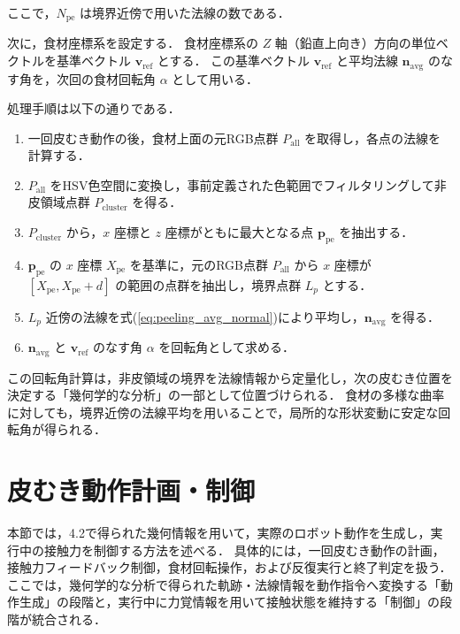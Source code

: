 ここで，$N_{\mathrm{pe}}$ は境界近傍で用いた法線の数である．

次に，食材座標系を設定する．
食材座標系の $Z$ 軸（鉛直上向き）方向の単位ベクトルを基準ベクトル $\mathbf{v}_{\mathrm{ref}}$ とする．
この基準ベクトル $\mathbf{v}_{\mathrm{ref}}$ と平均法線 $\mathbf{n}_{\mathrm{avg}}$ のなす角を，次回の食材回転角 $\alpha$ として用いる．


処理手順は以下の通りである．

\begin{enumerate}
  \item 一回皮むき動作の後，食材上面の元RGB点群 $P_{\mathrm{all}}$ を取得し，各点の法線を計算する．
  \item $P_{\mathrm{all}}$ をHSV色空間に変換し，事前定義された色範囲でフィルタリングして非皮領域点群 $P_{\mathrm{cluster}}$ を得る．
  \item $P_{\mathrm{cluster}}$ から，$x$ 座標と $z$ 座標がともに最大となる点 $\mathbf{p}_{\mathrm{pe}}$ を抽出する．
  \item $\mathbf{p}_{\mathrm{pe}}$ の $x$ 座標 $X_{\mathrm{pe}}$ を基準に，{元のRGB点群 $P_{\mathrm{all}}$} から $x$ 座標が $[X_{\mathrm{pe}}, X_{\mathrm{pe}} + d]$ の範囲の点群を抽出し，境界点群 $L_p$ とする．
  \item $L_p$ 近傍の法線を式(\ref{eq:peeling_avg_normal})により平均し，$\mathbf{n}_{\mathrm{avg}}$ を得る．
  \item $\mathbf{n}_{\mathrm{avg}}$ と $\mathbf{v}_{\mathrm{ref}}$ のなす角 $\alpha$ を回転角として求める．
\end{enumerate}

この回転角計算は，非皮領域の境界を法線情報から定量化し，次の皮むき位置を決定する「幾何学的な分析」の一部として位置づけられる．
食材の多様な曲率に対しても，境界近傍の法線平均を用いることで，局所的な形状変動に安定な回転角が得られる．

\section{皮むき動作計画・制御}
\label{sec:peeling_phase_motion}

本節では，4.2で得られた幾何情報を用いて，実際のロボット動作を生成し，実行中の接触力を制御する方法を述べる．
具体的には，一回皮むき動作の計画，接触力フィードバック制御，食材回転操作，および反復実行と終了判定を扱う．
ここでは，幾何学的な分析で得られた軌跡・法線情報を動作指令へ変換する「動作生成」の段階と，実行中に力覚情報を用いて接触状態を維持する「制御」の段階が統合される．

